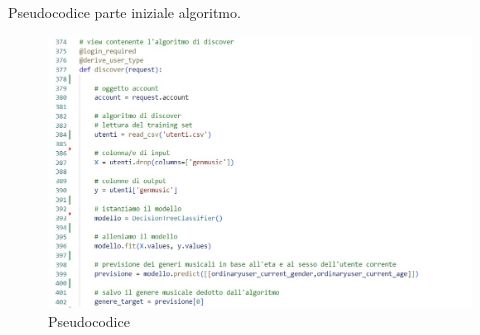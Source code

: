 Pseudocodice parte iniziale algoritmo. 
\begin{figure}[H]
    \centering
    \begin{center}
    \includegraphics[scale=0.7]{images/alg1.jpg}
    \end{center}
    \caption{Pseudocodice}
    \label{fig-pseudocodice-1}
\end{figure}




